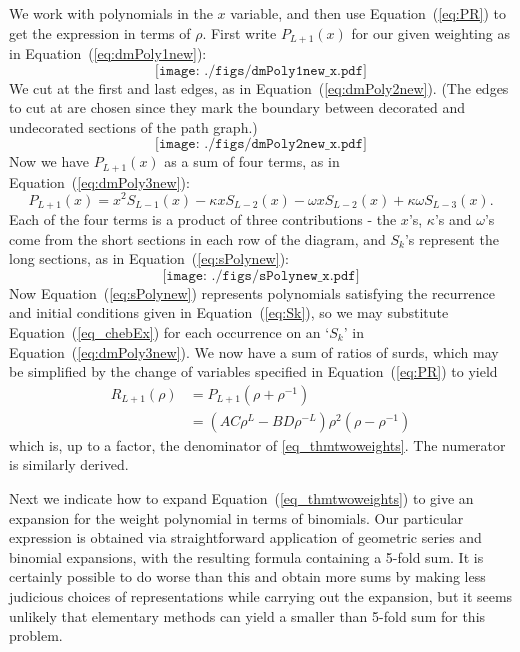 \documentclass[11pt,a4paper]{article}
\newcommand{\p}{\rho}
\begin{document}
We work with polynomials in the $x$ variable, and then use Equation~(\ref{eq:PR}) to get the expression in terms of $\p$. First write $P_{L+1}(x)$ for our given weighting as in Equation~(\ref{eq:dmPoly1new}):
\begin{equation} \label{eq:dmPoly1new}
	\texttt{[image: ./figs/dmPoly1new\_x.pdf]}	
\end{equation}
We cut at the first and last edges, as in Equation~(\ref{eq:dmPoly2new}).  (The edges to cut at are chosen since they mark the boundary between decorated and undecorated sections of the path graph.)
\begin{equation} \label{eq:dmPoly2new}
\texttt{[image: ./figs/dmPoly2new\_x.pdf]} 
\end{equation}
Now we have $P_{L+1}(x)$ as a sum of four terms, as in Equation~(\ref{eq:dmPoly3new}):
\begin{equation} \label{eq:dmPoly3new}
P_{L+1}(x) = x^2 S_{L-1}(x) - \kappa x S_{L-2}(x) - \omega x S_{L-2}(x) + \kappa \omega S_{L-3}(x).
\end{equation}
Each of the four terms is a product of three contributions - the $x$'s, $\kappa$'s and $\omega$'s come from the short sections in each row of the diagram, and $S_k$'s represent the long sections, as in Equation~(\ref{eq:sPolynew}):
\begin{equation} \label{eq:sPolynew}
\texttt{[image: ./figs/sPolynew\_x.pdf]}
\end{equation}
Now Equation~(\ref{eq:sPolynew}) represents polynomials satisfying the recurrence and initial conditions given in Equation~(\ref{eq:Sk}), so we may substitute Equation~(\ref{eq_chebEx}) for each occurrence on an `$S_k$' in Equation~(\ref{eq:dmPoly3new}).  We now have a sum of ratios of surds, which may be simplified by the change of variables specified in Equation~(\ref{eq:PR}) to yield
\begin{align}
R_{L+1}(\p) &= P_{L+1}(\p+  \p^{-1}) \\
&=(AC\p^L - BD \p^{-L})\p^2(\p-\p^{-1})
\end{align}
which is, up to a factor, the denominator of \eqref{eq_thmtwoweights}. The numerator is similarly derived.
 
Next we indicate how to expand Equation~(\ref{eq_thmtwoweights}) to give an expansion for the weight polynomial in terms of binomials.  Our particular expression  is obtained via straightforward application of geometric series and binomial expansions, with the resulting formula containing a 5-fold sum.  It is certainly possible to do worse than this and obtain more sums by making less judicious choices of representations while carrying out the expansion, but it seems unlikely that elementary methods can yield a smaller than 5-fold sum for this problem.
\end{document}
